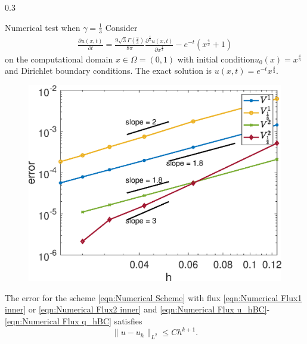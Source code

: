 \documentclass{msuposter}
\newcommand{\uh}{u_h}
\newcommand{\qh}{q_h}
\newcommand{\colwidth}{0.3\linewidth}
\begin{document}
\begin{frame}{}
\begin{columns}[t]
\begin{column}{\colwidth}
\begin{exampleblock}{Numerical test when $\gamma = 	\frac{1}{3}$}
Consider 
	\begin{equation}
	\begin{aligned}
	\frac{\partial u(x,t)}{\partial t} = \frac{9\sqrt{3}\Gamma(\frac{2}{3}) }{8\pi} \frac{\partial ^{\frac{4}{3}} u(x,t)}{\partial x^{\frac{4}{3}}} - e^{-t} (x^{\frac{4}{3}} +1)
	\end{aligned}
	\end{equation}
 on the computational domain $x\in \Omega =(0,1)$ with initial condition$u_0(x) = x^{\frac{4}{3}}$
	and Dirichlet boundary conditions. The exact solution is $u(x,t) = e^{-t}x^{\frac{4}{3}}$. 

	\begin{figure}
\includegraphics[width=0.8\linewidth]{Figure2}
\end{figure}
\end{exampleblock}
	
\begin{theorem}\label{thm:accuracy}
	The error for the scheme \eqref{eqn:Numerical Scheme} with flux \eqref{eqn:Numerical Flux1 inner} or \eqref{eqn:Numerical Flux2 inner} and \eqref{eqn:Numerical Flux \uh BC}-\eqref{eqn:Numerical Flux \qh BC} satisfies
	\begin{equation}\label{eqn:accuracy thm}
	\| u - \uh \|_{L^2}  \leq Ch^{k+1}.
	\end{equation}
\end{theorem}


\end{column}
\end{columns}
\end{frame}
\end{document}
